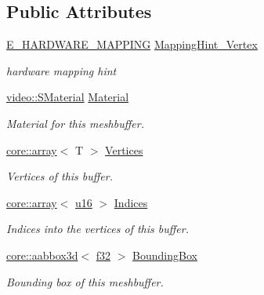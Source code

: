 \subsection*{Public Attributes}
\begin{DoxyCompactItemize}
\item 
\mbox{\label{classirr_1_1scene_1_1CMeshBuffer_af69f379242352b5a03bb135c02611909}} 
\hyperlink{namespaceirr_1_1scene_ac7d8ee8d77da75f2580bb9bb17231c27}{E\+\_\+\+H\+A\+R\+D\+W\+A\+R\+E\+\_\+\+M\+A\+P\+P\+I\+NG} \hyperlink{classirr_1_1scene_1_1CMeshBuffer_af69f379242352b5a03bb135c02611909}{Mapping\+Hint\+\_\+\+Vertex}
\begin{DoxyCompactList}\small\item\em hardware mapping hint \end{DoxyCompactList}\item 
\mbox{\label{classirr_1_1scene_1_1CMeshBuffer_a0b04ea5a95cda0b914f5ca5bd01283ab}} 
\hyperlink{classirr_1_1video_1_1SMaterial}{video\+::\+S\+Material} \hyperlink{classirr_1_1scene_1_1CMeshBuffer_a0b04ea5a95cda0b914f5ca5bd01283ab}{Material}
\begin{DoxyCompactList}\small\item\em Material for this meshbuffer. \end{DoxyCompactList}\item 
\mbox{\label{classirr_1_1scene_1_1CMeshBuffer_a7dcab02671df7d62fadb0d996474d853}} 
\hyperlink{classirr_1_1core_1_1array}{core\+::array}$<$ T $>$ \hyperlink{classirr_1_1scene_1_1CMeshBuffer_a7dcab02671df7d62fadb0d996474d853}{Vertices}
\begin{DoxyCompactList}\small\item\em Vertices of this buffer. \end{DoxyCompactList}\item 
\mbox{\label{classirr_1_1scene_1_1CMeshBuffer_a298043df538ddcedc6586e20723b0665}} 
\hyperlink{classirr_1_1core_1_1array}{core\+::array}$<$ \hyperlink{namespaceirr_ae9f8ec82692ad3b83c21f555bfa70bcc}{u16} $>$ \hyperlink{classirr_1_1scene_1_1CMeshBuffer_a298043df538ddcedc6586e20723b0665}{Indices}
\begin{DoxyCompactList}\small\item\em Indices into the vertices of this buffer. \end{DoxyCompactList}\item 
\mbox{\label{classirr_1_1scene_1_1CMeshBuffer_a9e16abdff220a4f7a5ffff992d3ef1d6}} 
\hyperlink{classirr_1_1core_1_1aabbox3d}{core\+::aabbox3d}$<$ \hyperlink{namespaceirr_a0277be98d67dc26ff93b1a6a1d086b07}{f32} $>$ \hyperlink{classirr_1_1scene_1_1CMeshBuffer_a9e16abdff220a4f7a5ffff992d3ef1d6}{Bounding\+Box}
\begin{DoxyCompactList}\small\item\em Bounding box of this meshbuffer. \end{DoxyCompactList}\end{DoxyCompactItemize}
